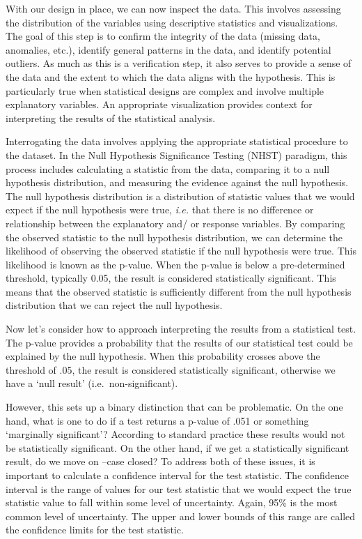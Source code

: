 \documentclass[
  letterpaper,
]{latex/krantz}
\theoremstyle{definition}
\theoremstyle{remark}
\begin{document}
With our design in place, we can now inspect the data. This involves
assessing the distribution of the variables using descriptive statistics
and visualizations. The goal of this step is to confirm the integrity of
the data (missing data, anomalies, etc.), identify general patterns in
the data, and identify potential outliers. As much as this is a
verification step, it also serves to provide a sense of the data and the
extent to which the data aligns with the hypothesis. This is
particularly true when statistical designs are complex and involve
multiple explanatory variables. An appropriate visualization provides
context for interpreting the results of the statistical analysis.

Interrogating the data involves applying the appropriate statistical
procedure to the dataset. In the Null Hypothesis Significance Testing
(NHST) paradigm, this process includes calculating a statistic from the
data, comparing it to a null hypothesis distribution, and measuring the
evidence against the null hypothesis. The null hypothesis distribution
is a distribution of statistic values that we would expect if the null
hypothesis were true, \emph{i.e.} that there is no difference or
relationship between the explanatory and/ or response variables. By
comparing the observed statistic to the null hypothesis distribution, we
can determine the likelihood of observing the observed statistic if the
null hypothesis were true. This likelihood is known as the p-value. When
the p-value is below a pre-determined threshold, typically 0.05, the
result is considered statistically significant. This means that the
observed statistic is sufficiently different from the null hypothesis
distribution that we can reject the null hypothesis.

Now let's consider how to approach interpreting the results from a
statistical test. The p-value provides a probability that the results of
our statistical test could be explained by the null hypothesis. When
this probability crosses above the threshold of .05, the result is
considered statistically significant, otherwise we have a `null result'
(i.e.~non-significant).

However, this sets up a binary distinction that can be problematic. On
the one hand, what is one to do if a test returns a p-value of .051 or
something `marginally significant'? According to standard practice these
results would not be statistically significant. On the other hand, if we
get a statistically significant result, do we move on --case closed? To
address both of these issues, it is important to calculate a confidence
interval for the test statistic. The confidence interval is the range of
values for our test statistic that we would expect the true statistic
value to fall within some level of uncertainty. Again, 95\% is the most
common level of uncertainty. The upper and lower bounds of this range
are called the confidence limits for the test statistic.
\end{document}
